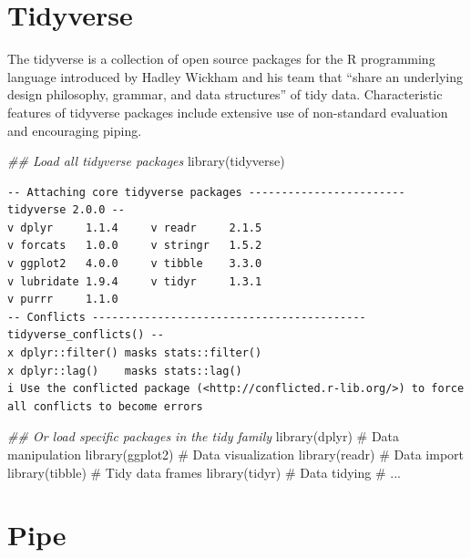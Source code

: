 \documentclass[
  letterpaper,
  DIV=11,
  numbers=noendperiod]{scrreprt}
\newenvironment{Shaded}{\begin{snugshade}}{\end{snugshade}}
\newcommand{\CommentTok}[1]{\textcolor[rgb]{0.37,0.37,0.37}{#1}}
\newcommand{\DocumentationTok}[1]{\textcolor[rgb]{0.37,0.37,0.37}{\textit{#1}}}
\newcommand{\FunctionTok}[1]{\textcolor[rgb]{0.28,0.35,0.67}{#1}}
\newcommand{\NormalTok}[1]{\textcolor[rgb]{0.00,0.23,0.31}{#1}}
\begin{document}
\section{Tidyverse}\label{tidyverse}

The tidyverse is a collection of open source packages for the R
programming language introduced by Hadley Wickham and his team that
``share an underlying design philosophy, grammar, and data structures''
of tidy data. Characteristic features of tidyverse packages include
extensive use of non-standard evaluation and encouraging piping.

\begin{Shaded}
\begin{Highlighting}[]
\DocumentationTok{\#\# Load all tidyverse packages}
\FunctionTok{library}\NormalTok{(tidyverse)}
\end{Highlighting}
\end{Shaded}

\begin{verbatim}
-- Attaching core tidyverse packages ------------------------ tidyverse 2.0.0 --
v dplyr     1.1.4     v readr     2.1.5
v forcats   1.0.0     v stringr   1.5.2
v ggplot2   4.0.0     v tibble    3.3.0
v lubridate 1.9.4     v tidyr     1.3.1
v purrr     1.1.0     
-- Conflicts ------------------------------------------ tidyverse_conflicts() --
x dplyr::filter() masks stats::filter()
x dplyr::lag()    masks stats::lag()
i Use the conflicted package (<http://conflicted.r-lib.org/>) to force all conflicts to become errors
\end{verbatim}

\begin{Shaded}
\begin{Highlighting}[]
\DocumentationTok{\#\# Or load specific packages in the tidy family}
\FunctionTok{library}\NormalTok{(dplyr) }\CommentTok{\# Data manipulation}
\FunctionTok{library}\NormalTok{(ggplot2) }\CommentTok{\# Data visualization}
\FunctionTok{library}\NormalTok{(readr) }\CommentTok{\# Data import}
\FunctionTok{library}\NormalTok{(tibble) }\CommentTok{\# Tidy data frames}
\FunctionTok{library}\NormalTok{(tidyr) }\CommentTok{\# Data tidying}
\CommentTok{\# ...}
\end{Highlighting}
\end{Shaded}

\section{Pipe}\label{pipe}
\end{document}
